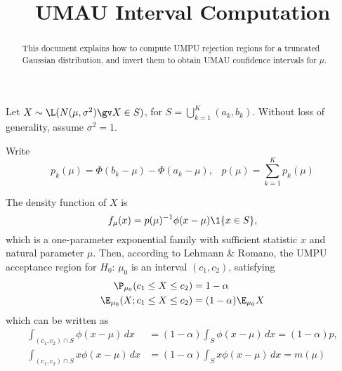 \documentclass{article}
\begin{document}
\newtheorem{theorem}{Theorem}
\newtheorem{corollary}[theorem]{Corollary}
\newtheorem{lemma}[theorem]{Lemma}
\newtheorem{observation}[theorem]{Observation}
\newtheorem{proposition}[theorem]{Proposition}
\newtheorem{definition}[theorem]{Definition}
\newtheorem{claim}[theorem]{Claim}
\newtheorem{fact}[theorem]{Fact}
\newtheorem{assumption}[theorem]{Assumption}

\renewcommand{\S}{\mathcal{S}}
\newcommand{\FDR}{\textnormal{FDR}}
\newcommand{\FCR}{\textnormal{FCR}}

\title{UMAU Interval Computation}
\maketitle

\newcommand{\crt}{\rho}

\begin{abstract}
  This document explains how to compute UMPU rejection regions for a
  truncated Gaussian distribution, and invert them to obtain UMAU
  confidence intervals for $\mu$.
\end{abstract}

Let $X\sim \L(N(\mu, \sigma^2) \gv X \in S)$, for $S = \bigcup_{k=1}^K
(a_k, b_k)$.  Without loss of generality, assume $\sigma^2 = 1$.

Write
\begin{equation}
  p_k(\mu) = \Phi(b_k-\mu) - \Phi(a_k-\mu), \;\;\; p(\mu) =
  \sum_{k=1}^K p_k(\mu)
\end{equation}

The density function of $X$ is
\begin{equation}
  f_\mu(x) = p(\mu)^{-1} \phi(x-\mu) \1\{x\in S\},
\end{equation}
which is a one-parameter exponential family with sufficient statistic
$x$ and natural parameter $\mu$.  Then, according to Lehmann \&
Romano, the UMPU acceptance region for $H_0:\,\mu_0$ is an interval $(c_1, c_2)$,
satisfying
\begin{align}
  \P_{\mu_0}(c_1 \leq X \leq c_2) &= 1-\alpha\\
  \E_{\mu_0}(X; c_1 \leq X \leq c_2) &= (1-\alpha) \E_{\mu_0} X
\end{align}
which can be written as
\begin{align}
  \int_{(c_1,c_2) \cap S} \phi(x-\mu)\,dx &= (1-\alpha) \int_S
  \phi(x-\mu)\,dx = (1-\alpha)p, \\
  \int_{(c_1,c_2) \cap S} x\phi(x-\mu)\,dx &= (1-\alpha) \int_S
  x\phi(x-\mu)\,dx = m(\mu)
\end{align}
\end{document}
